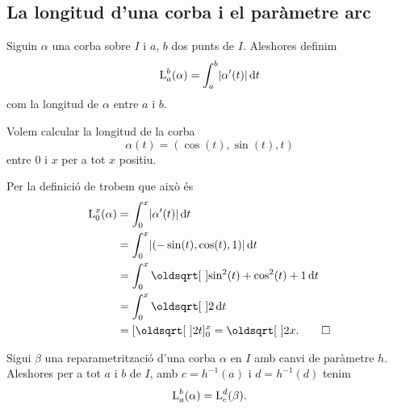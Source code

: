 \documentclass[../Apunts.tex]{subfiles}
\begin{document}
	\subsection{La longitud d'una corba i el paràmetre arc}
	\begin{definition}
		\label{def:longitud d'una corba}
		Siguin \(\alpha\) una corba sobre \(I\) i \(a\), \(b\) dos punts de \(I\). Aleshores definim
		\[\Long_{a}^{b}(\alpha)=\int_{a}^{b}\norm{\alpha'(t)}\diff t\]
		com la longitud de \(\alpha\) entre \(a\) i \(b\).
	\end{definition}
	\begin{example}
		\label{ex:longitud d'una corba}
		Volem calcular la longitud de la corba
		\[\alpha(t)=(\cos(t),\sin(t),t)\]
		entre \(0\) i \(x\) per a tot \(x\) positiu.
	\end{example}
	\begin{solution}
		Per la definició de  trobem que això és
		\begin{align*}
			\Long_{0}^{x}(\alpha)&=\int_{0}^{x}\norm{\alpha'(t)}\diff t \\
			&=\int_{0}^{x}\norm{(-\sin(t),\cos(t),1)}\diff t \\
			&=\int_{0}^{x}\sqrt{\sin^{2}(t)+\cos^{2}(t)+1}\diff t \\
			&=\int_{0}^{x}\sqrt{2}\diff t \\
			&=[\sqrt{2}t]_{0}^{x}=\sqrt{2}x.\qedhere
		\end{align*}
	\end{solution}
	\begin{proposition}
		Sigui \(\beta\) una reparametrització d'una corba \(\alpha\) en \(I\) amb canvi de paràmetre \(h\). Aleshores per a tot \(a\) i \(b\) de \(I\), amb \(c=h^{-1}(a)\) i \(d=h^{-1}(d)\) tenim
		\[\operatorname{L}_{a}^{b}(\alpha)=\operatorname{L}_{c}^{d}(\beta).\]
	\end{proposition}
\end{document}
